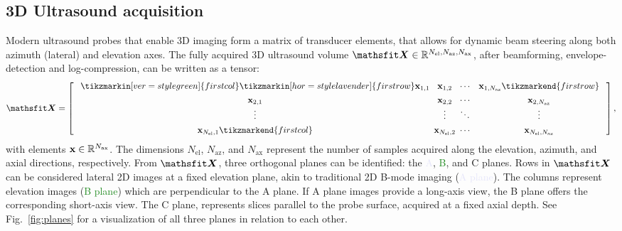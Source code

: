 \documentclass[journal,twoside,web,dvipsnames]{ieeecolor}          %
\begin{document}
\subsection{3D Ultrasound acquisition}\label{sec:3d-ultrasound}
Modern ultrasound probes that enable 3D imaging form a matrix of transducer elements, that allows for dynamic beam steering along both azimuth (lateral) and elevation axes. The fully acquired 3D ultrasound volume $\tX\in\sR^{N_\text{el}, N_\text{az}, N_\text{ax}}$, after beamforming, envelope-detection and log-compression, can be written as a tensor:
\begin{equation}
    \tX =
    \left[\begin{array}{@{\hspace{0.8em}}c@{\hspace{0.5em}}c@{\hspace{0.5em}}c@{\hspace{1em}}c@{\hspace{0.8em}}}
        \tikzmarkin[ver=style green]{firstcol}\tikzmarkin[hor=style lavender]{firstrow}\rvx_{1,1} & \rvx_{1,2} & \cdots & \rvx_{1,N_\text{az}}\tikzmarkend{firstrow} \\[0.4em]
        \rvx_{2,1} & \rvx_{2,2} & \cdots & \rvx_{2,N_\text{az}} \\
        \vdots & \vdots & \ddots & \vdots \\[0.4em]
        \rvx_{N_\text{el},1}\tikzmarkend{firstcol} & \rvx_{N_\text{el},2} & \cdots & \rvx_{N_\text{el},N_\text{az}}
        \end{array}\right],
\label{eq:ultrasound-volume}
\end{equation}
with elements ${\mathbf{x}}\in{\mathbb{R}}^{N_\text{ax}}$. The dimensions $N_\text{el}$, $N_\text{az}$, and $N_\text{ax}$ represent the number of samples acquired along the elevation, azimuth, and axial directions, respectively. From $\tX$, three orthogonal planes can be identified: the \textcolor{Lavender}{A}, \textcolor{ForestGreen}{B}, and \textcolor{TMIBlue}{C} planes. Rows in $\tX$ can be considered lateral 2D images at a fixed elevation plane, akin to traditional 2D B-mode imaging (\textcolor{Lavender}{A plane}). The columns represent elevation images (\textcolor{ForestGreen}{B plane}) which are perpendicular to the A plane. If A plane images provide a long-axis view, the B plane offers the corresponding short-axis view. \textcolor{TMIBlue}{The C plane}, represents slices parallel to the probe surface, acquired at a fixed axial depth. See Fig.~\ref{fig:planes} for a visualization of all three planes in relation to each other.
\end{document}
